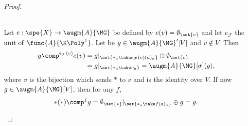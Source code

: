 \begin{proof}
\begin{description}
\begin{equation}
\begin{split}
        \end{split}\end{equation}
        \item[Unity.] Let $e: \spe{X}\to \augm{A}{\MG}$ be defined by $e(v) = \emptyset_{\set{v}}$ and 
        let $e_{\mathcal{F}}$ the unit of $\func{A}{\K\Poly^1}$. Let be $g\in\augm{A}{\MG}'[V]$ and 
        $v\not\in V$. Then
        \begin{equation}\begin{split}
            g\comp^{e_{\mathcal{F}}(v)}e(v) 
            &= g|_{\set{\ast_a \take e_{\mathcal{F}}(v)(a)_a}}\oplus\emptyset_{\set{v}} \\
            &= g|_{\set{\ast_a \take v_a}} = \augm{A}{\MG}[\sigma](g),
        \end{split}\end{equation}
        where $\sigma$ is the bijection which sends $\ast$ to $v$ and is the identity over $V$. If now 
        $g\in\augm{A}{\MG}[V]$, then for any $f$,
        \begin{equation}
            e(\ast)\comp^f g = \emptyset_{\set{\ast}}|_{\set{\ast_a \take f(a)_a}}\oplus g = g. \qedhere
        \end{equation}
    \end{description}
\end{proof}

